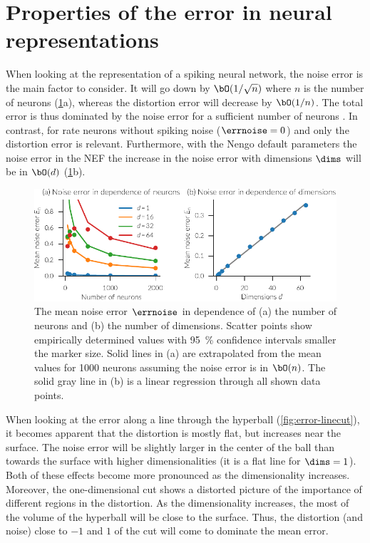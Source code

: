\section{Properties of the error in neural representations}
When looking at the representation of a spiking neural network, the noise error is the main factor to consider.
It will go down by $\bO(1/\sqrt{n})$ where $n$ is the number of neurons (\cref{fig:noise-error}a), whereas the distortion error will decrease by $\bO(1/n)$.
The total error is thus dominated by the noise error for a sufficient number of neurons \parencite[Fig.~2.6]{eliasmith2003}.
In contrast, for rate neurons without spiking noise ($\errnoise = 0$) and only the distortion error is relevant.
Furthermore, with the Nengo default parameters the noise error in the NEF the increase in the noise error with dimensions $\dims$ will be in $\bO(d)$ (\cref{fig:noise-error}b).
\begin{figure}
    \centering
    \includegraphics{figures/noise-error}
    \caption[Mean noise error with $\csdist(\dims + 2)$ distributed intercepts]{The mean noise error $\errnoise$ in dependence of (a) the number of neurons and (b) the number of dimensions. Scatter points show empirically determined values with \SI{95}{\percent} confidence intervals smaller the marker size. Solid lines in (a) are extrapolated from the mean values for \num{1000} neurons assuming the noise error is in $\bO(n)$. The solid gray line in (b) is a linear regression through all shown data points.}\label{fig:noise-error}
\end{figure}

When looking at the error along a line through the hyperball (\cref{fig:error-linecut}), it becomes apparent that the distortion is mostly flat, but increases near the surface.
The noise error will be slightly larger in the center of the ball than towards the surface with higher dimensionalities (it is a flat line for $\dims = 1$).
Both of these effects become more pronounced as the dimensionality increases.
Moreover, the one-dimensional cut shows a distorted picture of the importance of different regions in the distortion.
As the dimensionality increases, the most of the volume of the hyperball will be close to the surface.
Thus, the distortion (and noise) close to $-1$ and $1$ of the cut will come to dominate the mean error.

